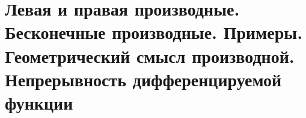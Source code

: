 \section{Левая и правая производные. Бесконечные производные. Примеры. Геометрический смысл производной. Непрерывность дифференцируемой функции}